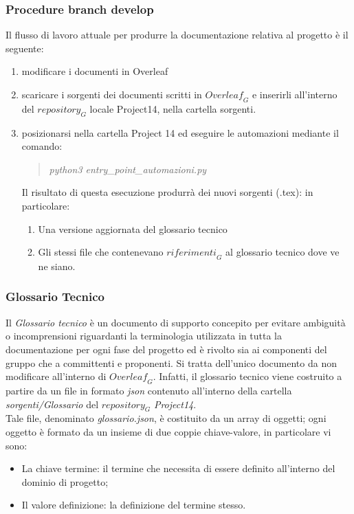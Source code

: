 \subsubsection{Procedure branch develop }

Il flusso di lavoro attuale per produrre la documentazione relativa al progetto è il seguente:
\begin{enumerate}
    \item modificare i documenti in Overleaf
    \item scaricare i sorgenti dei documenti scritti in $\textit{Overleaf}_G$ e inserirli all'interno del $\textit{repository}_G$ locale Project14, nella cartella sorgenti.
    \item posizionarsi nella cartella Project 14 ed eseguire le automazioni mediante il comando:
        \begin{quote}
            \emph{  python3 entry\_point\_automazioni.py} 
        \end{quote}
    Il risultato di questa esecuzione produrrà dei nuovi sorgenti (.tex): in particolare:
    \begin{enumerate}
        \item Una versione aggiornata del glossario tecnico
        \item Gli stessi file che contenevano $\textit{riferimenti}_G$ al glossario tecnico dove ve ne siano.
    \end{enumerate}
\end{enumerate}

\subsubsection{Glossario Tecnico}
Il \emph{Glossario tecnico} è un documento di supporto concepito per evitare ambiguità o incomprensioni riguardanti la terminologia utilizzata in tutta la documentazione per ogni fase del progetto ed è rivolto sia ai componenti del gruppo che a committenti e proponenti.
Si tratta dell'unico documento da non modificare all'interno di $\textit{Overleaf}_G$. Infatti, il glossario tecnico viene costruito a partire da un file in formato \emph{json} contenuto all'interno della cartella \emph{sorgenti/Glossario} del $\textit{repository}_G$ \emph{Project14}.\\
Tale file, denominato \emph{glossario.json}, è costituito da un array di oggetti; ogni oggetto è formato da un insieme di due coppie chiave-valore, in particolare vi sono:
\begin{itemize}
    \item La chiave termine: il termine che necessita di essere definito all'interno del dominio di progetto;
    \item Il valore definizione: la definizione del termine stesso.
\end{itemize}
